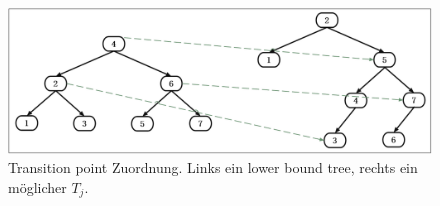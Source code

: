 \documentclass[a4paper,12pt]{article}
\begin{document}
\begin{figure}[H]
	\centering
	\includegraphics[width=1\textwidth]{"Medien/Tango/transitionPoints"}
	\caption{Transition point Zuordnung. Links ein lower bound tree, rechts ein möglicher $T_j$.   }
	\label{fig:transitionPoints}
\end{figure}
\end{document}

